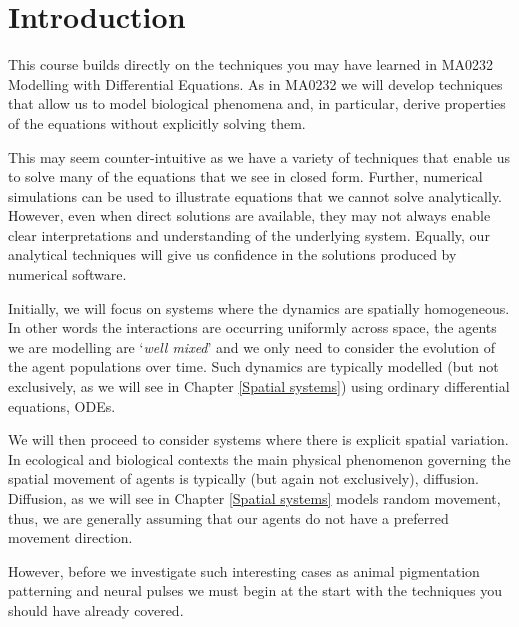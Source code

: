 \chapter{Introduction}
This course builds directly on the techniques you may have learned in  MA0232 Modelling with Differential Equations. As in MA0232 we will develop techniques that allow us to model biological phenomena and, in particular, derive properties of the equations without explicitly solving them.

This may seem counter-intuitive as we have a variety of techniques that enable us to solve many of the equations that we see in closed form. Further, numerical simulations can be used to illustrate equations that we cannot solve analytically. However, even when direct solutions are available, they may not always enable clear interpretations and understanding of the underlying system. Equally, our analytical techniques will give us confidence in the solutions produced by numerical software.

Initially, we will focus on systems where the dynamics are spatially homogeneous. In other words the interactions are occurring uniformly across space, the agents we are modelling are `\textit{well mixed}' and we only need to consider the evolution of the agent populations over time. Such dynamics are typically modelled (but not exclusively, as we will see in Chapter \ref{Spatial systems}) using ordinary differential equations, ODEs.

We will then proceed to consider systems where there is explicit spatial variation. In  ecological and biological contexts the main physical phenomenon governing the spatial movement of agents is typically (but again not exclusively),  diffusion. Diffusion, as we will see in Chapter \ref{Spatial systems} models random movement, thus, we are generally assuming that our agents do not have a preferred movement direction.

However, before we investigate such interesting cases as animal pigmentation patterning and neural pulses we must begin at the start with the techniques you should have already covered.

